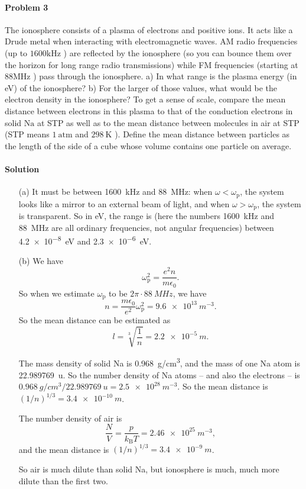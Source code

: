 \documentclass[hyperref, a4paper]{article}
\begin{document}
\paragraph{Problem 3} The ionosphere consists of a plasma of electrons and positive ions. It acts like a Drude metal when interacting with electromagnetic waves. AM radio frequencies (up to $1600 \mathrm{kHz}$ ) are reflected by the ionosphere (so you can bounce them over the horizon for long range radio transmissions) while FM frequencies (starting at $88 \mathrm{MHz}$ ) pass through the ionosphere.
a) In what range is the plasma energy (in eV) of the ionosphere?
b) For the larger of those values, what would be the electron density in the ionosphere? To get a sense of scale, compare the mean distance between electrons in this plasma to that of the conduction electrons in solid $\mathrm{Na}$ at STP as well as to the mean distance between molecules in air at STP (STP means $1 \mathrm{~atm}$ and $298 \mathrm{~K}$ ). Define the mean distance between particles as the length of the side of a cube whose volume contains one particle on average.

\paragraph{Solution} \begin{itemize}
\item[(a)] It must be between \SI{1600}{kHz} and \SI{88}{MHz}:
when $\omega < \omega_{\text{p}}$,
the system looks like a mirror to an external beam of light,
and when $\omega > \omega_{\text{p}}$,
the system is transparent.
So in \si{eV}, the range is 
(here the numbers \SI{1600}{kHz} and \SI{88}{MHz} are all ordinary frequencies, not angular frequencies)
between \SI{4.2e-8}{eV} and \SI{2.3e-6}{eV}.

\item[(b)] We have 
\begin{equation}
    \omega_{\text{p}}^2 = \frac{e^2 n}{m \epsilon_0}.
\end{equation}
So when we estimate $\omega_{\text{p}}$ to be $2\pi \cdot \SI{88}{MHz}$, we have 
\begin{equation}
    n = \frac{m \epsilon_0}{e^2} \omega_{\text{p}}^2 = \SI{9.6e13}{m^{-3}}.
\end{equation}
So the mean distance can be estimated as 
\begin{equation}
    l = \sqrt[3]{\frac{1}{n}} = \SI{2.2e-5}{m}.
\end{equation} 

The mass density of solid Na is \SI{0.968}{g/cm^3}, 
and the mass of one Na atom is \SI{22.989769}{u}.
So the number density of Na atoms -- and also the electrons -- is 
$\SI{0.968}{g/cm^3} / \SI{22.989769}{u} = \SI{2.5e28}{m^{-3}}$.
So the mean distance is $(1 / n)^{1/3} = \SI{3.4e-10}{m}$.

The number density of air is 
\[
    \frac{N}{V} = \frac{p}{k_{\text{B}} T} = \SI{2.46e25}{m^{-3}},
\]
and the mean distance is $(1/n)^{1/3} = \SI{3.4e-9}{m}$.

So air is much dilute than solid Na, but ionosphere is much, much more dilute than the first two.

\end{itemize}
\end{document}
